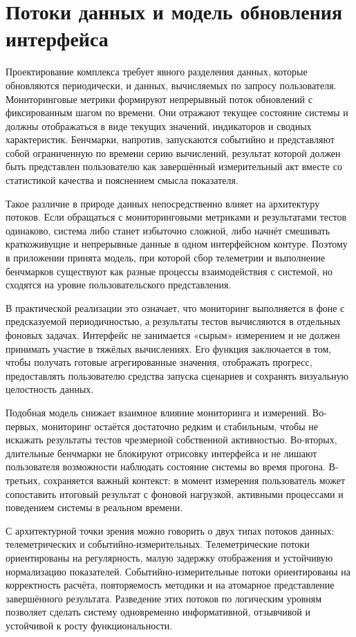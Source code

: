 \section{Потоки данных и модель обновления интерфейса}

Проектирование комплекса требует явного разделения данных, которые обновляются периодически, и данных, вычисляемых по запросу пользователя. Мониторинговые метрики формируют непрерывный поток обновлений с фиксированным шагом по времени. Они отражают текущее состояние системы и должны отображаться в виде текущих значений, индикаторов и сводных характеристик. Бенчмарки, напротив, запускаются событийно и представляют собой ограниченную по времени серию вычислений, результат которой должен быть представлен пользователю как завершённый измерительный акт вместе со статистикой качества и пояснением смысла показателя.

Такое различие в природе данных непосредственно влияет на архитектуру потоков. Если обращаться с мониторинговыми метриками и результатами тестов одинаково, система либо станет избыточно сложной, либо начнёт смешивать краткоживущие и непрерывные данные в одном интерфейсном контуре. Поэтому в приложении принята модель, при которой сбор телеметрии и выполнение бенчмарков существуют как разные процессы взаимодействия с системой, но сходятся на уровне пользовательского представления.

В практической реализации это означает, что мониторинг выполняется в фоне с предсказуемой периодичностью, а результаты тестов вычисляются в отдельных фоновых задачах. Интерфейс не занимается «сырым» измерением и не должен принимать участие в тяжёлых вычислениях. Его функция заключается в том, чтобы получать готовые агрегированные значения, отображать прогресс, предоставлять пользователю средства запуска сценариев и сохранять визуальную целостность данных.

Подобная модель снижает взаимное влияние мониторинга и измерений. Во-первых, мониторинг остаётся достаточно редким и стабильным, чтобы не искажать результаты тестов чрезмерной собственной активностью. Во-вторых, длительные бенчмарки не блокируют отрисовку интерфейса и не лишают пользователя возможности наблюдать состояние системы во время прогона. В-третьих, сохраняется важный контекст: в момент измерения пользователь может сопоставить итоговый результат с фоновой нагрузкой, активными процессами и поведением системы в реальном времени.

С архитектурной точки зрения можно говорить о двух типах потоков данных: телеметрических и событийно-измерительных. Телеметрические потоки ориентированы на регулярность, малую задержку отображения и устойчивую нормализацию показателей. Событийно-измерительные потоки ориентированы на корректность расчёта, повторяемость методики и на атомарное представление завершённого результата. Разведение этих потоков по логическим уровням позволяет сделать систему одновременно информативной, отзывчивой и устойчивой к росту функциональности.

